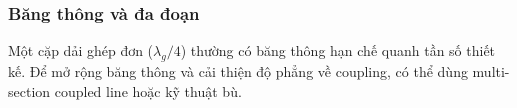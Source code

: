 \subsubsection{Băng thông và đa đoạn}

Một cặp dải ghép đơn ($\lambda_g/4$) thường có băng thông hạn chế quanh tần số thiết kế. 
Để mở rộng băng thông và cải thiện độ phẳng về coupling, có thể dùng multi-section coupled line hoặc kỹ thuật bù.

